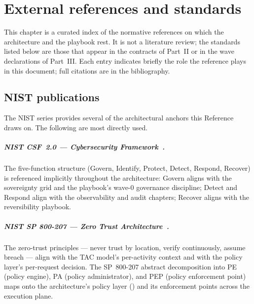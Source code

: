 
\chapter{External references and standards}
\label{ch:external-references}

This chapter is a curated index of the normative references on
which the architecture and the playbook rest. It is not a
literature review; the standards listed below are those that
appear in the contracts of Part~II or in the wave declarations of
Part~III. Each entry indicates briefly the role the reference plays
in this document; full citations are in the bibliography.

\section{NIST publications}
\label{sec:er-nist}

The NIST series provides several of the architectural anchors
this Reference draws on. The following are most directly used.

\paragraph{NIST CSF~2.0 --- Cybersecurity Framework~\cite{nist-csf}.} The five-function structure (Govern,
Identify, Protect, Detect, Respond, Recover) is referenced
implicitly throughout the architecture: Govern aligns with the
sovereignty grid and the playbook's wave-0 governance discipline;
Detect and Respond align with the observability and audit
chapters; Recover aligns with the reversibility playbook.

\paragraph{NIST SP 800-207 --- Zero Trust
Architecture~\cite{nist-zt}.} The zero-trust principles --- never
trust by location, verify continuously, assume breach --- align
with the TAC model's per-activity context and with the policy
layer's per-request decision. The SP~800-207 abstract decomposition
into PE (policy engine), PA (policy administrator), and PEP
(policy enforcement point) maps onto the architecture's policy
layer () and its enforcement points across the
execution plane.

